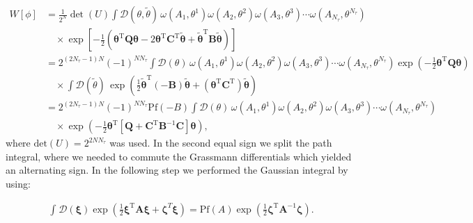 \documentclass{article}
\begin{document}
\begin{align}
	W\left[ \phi \right] &= \frac{1}{2^N} \det\!\left(U\right) 
	\int \mathcal{D}\left({\theta},\tilde{\theta}\right)\,
	\omega\!\left(A_1, \theta^1\right)
	\omega\!\left(A_2, \theta^2\right)
	\omega\!\left(A_3, \theta^3\right)
	\cdots
	\omega\!\left(A_{N_\tau}, \theta^{N_\tau}\right) \nonumber \\
	&\quad \times \exp\!\left[
	-\frac{1}{2}
	\left(
	\boldsymbol{\theta}^\mathrm{T} \boldsymbol{Q} \boldsymbol{\theta}
	- 2 \boldsymbol{\theta}^\mathrm{T}\boldsymbol{C}^\mathrm{T} \boldsymbol{\tilde{\theta}}
	+ \boldsymbol{\tilde{\theta}}^\mathrm{T} \boldsymbol{B} \boldsymbol{\tilde{\theta}}
	\right)
	\right] \nonumber \\
	&= 2^{\left(2N_\tau - 1\right)N}\left(-1\right)^{N N_\tau}
	\int \mathcal{D}\left(\theta\right)\,
	\omega\!\left(A_1, \theta^1\right)
	\omega\!\left(A_2, \theta^2\right)
	\omega\!\left(A_3, \theta^3\right)
	\cdots
	\omega\!\left(A_{N_\tau}, \theta^{N_\tau}\right)
	\exp\!\left(
	-\frac{1}{2} \boldsymbol{\theta}^\mathrm{T} \boldsymbol{Q} \boldsymbol{\theta}
	\right) \nonumber \\
	&\quad \times \int \mathcal{D}\left(\tilde{\theta}\right)\,
	\exp\!\left(
	\frac{1}{2} \boldsymbol{\tilde{\theta}}^\mathrm{T} \left(-\boldsymbol{B}\right)\boldsymbol{\tilde{\theta}}
	+ \left(\boldsymbol{\theta}^\mathrm{T}\boldsymbol{C}^\mathrm{T}\right)\boldsymbol{\tilde{\theta}}
	\right) \nonumber \\
	&= 2^{\left(2N_\tau - 1\right)N}\left(-1\right)^{N N_\tau}\mathrm{Pf} \left(-B\right) 
	\int \mathcal{D}\left(\theta\right)\,
	\omega\!\left(A_1, \theta^1\right)
	\omega\!\left(A_2, \theta^2\right)
	\omega\!\left(A_3, \theta^3\right)
	\cdots
	\omega\!\left(A_{N_\tau}, \theta^{N_\tau}\right) \nonumber\\
	&\quad\times\exp\!\left(
	-\frac{1}{2} \boldsymbol{\theta}^\mathrm{T} \left[ \boldsymbol{Q} + \boldsymbol{C}^\mathrm{T}\boldsymbol{B}^{-1}\boldsymbol{C}\right]\boldsymbol{\theta}
	\right),
\end{align}
where $\mathrm{det}\left(U\right)  = 2^{2NN_\tau}$ was used. In the second equal sign we split the path integral, where we needed to commute the Grassmann differentials which yielded an alternating sign. In the following step we performed the Gaussian integral by using:

\begin{align}
	\int_{ }^{ } \mathcal{D}\left(\boldsymbol{\xi}\right) \exp \left( \frac{1}{2} \boldsymbol{\xi}^\mathrm{T} \boldsymbol{A} \boldsymbol{\xi} + \boldsymbol{\zeta}^T \boldsymbol{\xi}   \right) = \mathrm{Pf} \left(A\right) \exp \left( \frac{1}{2} \boldsymbol{\zeta}^\mathrm{T} \boldsymbol{A}^{-1} \boldsymbol{\zeta}  \right). 
\end{align}
\end{document}
